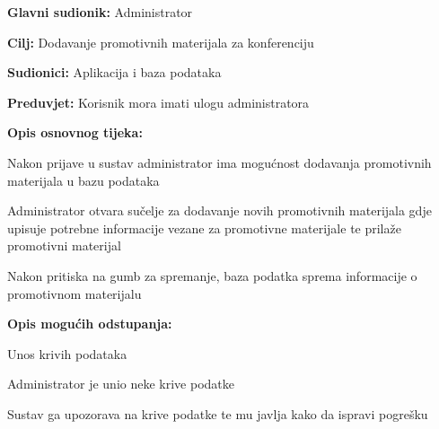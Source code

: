 				\noindent {}
				\begin{packed_item}
					
					\item \textbf{Glavni sudionik: } Administrator
					\item  \textbf{Cilj:} Dodavanje promotivnih materijala za konferenciju
					\item  \textbf{Sudionici:} Aplikacija i baza podataka
					\item  \textbf{Preduvjet:} Korisnik mora imati ulogu administratora
					\item  \textbf{Opis osnovnog tijeka:}
					
					\item[] \begin{packed_enum}
						
						\item Nakon prijave u sustav administrator ima mogućnost dodavanja promotivnih materijala u bazu podataka
						\item Administrator otvara sučelje za dodavanje novih promotivnih materijala gdje upisuje potrebne informacije vezane za promotivne materijale te prilaže promotivni materijal
						\item Nakon pritiska na gumb za spremanje, baza podatka sprema informacije o promotivnom materijalu
					\end{packed_enum}
					
					\item  \textbf{Opis mogućih odstupanja:}
					
					\item[] \begin{packed_item}
						
						\item[2.a] Unos krivih podataka
						\item[] \begin{packed_enum}
							
							\item Administrator je unio neke krive podatke
							\item Sustav ga upozorava na krive podatke te mu javlja kako da ispravi pogrešku
							
						\end{packed_enum}
						
						
					\end{packed_item}
				\end{packed_item}
				
